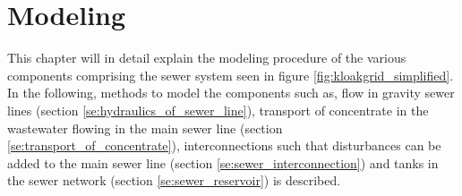 \chapter{Modeling}\label{se:modeling}

This chapter will in detail explain the modeling procedure of the various components comprising the sewer system seen in figure \ref{fig:kloakgrid_simplified}.
In the following, methods to model the components such as, flow in gravity sewer lines (section \ref{se:hydraulics_of_sewer_line}), transport of concentrate in the wastewater flowing in the main sewer line (section \ref{se:transport_of_concentrate}), interconnections such that disturbances can be added to the main sewer line (section \ref{se:sewer_interconnection}) and tanks in the sewer network (section \ref{se:sewer_reservoir}) is described. 






